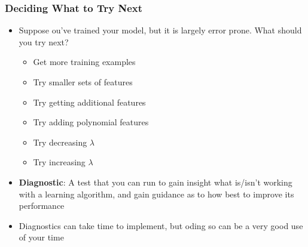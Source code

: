 \subsubsection{Deciding What to Try Next}
\begin{itemize}[--]
	\item Suppose ou've trained your model, but it is largely error prone. What should you try next?
	\begin{itemize}[--]
		\item Get more training examples
		\item Try smaller sets of features
		\item Try getting additional features
		\item Try adding polynomial features
		\item Try decreasing $\lambda$
		\item Try increasing $\lambda$
	\end{itemize}

	\item \textbf{Diagnostic}: A test that you can run to gain insight what is/isn't working with a learning algorithm, and gain guidance as to how best to improve its performance
	\item Diagnostics can take time to implement, but oding so can be a very good use of your time
\end{itemize}

